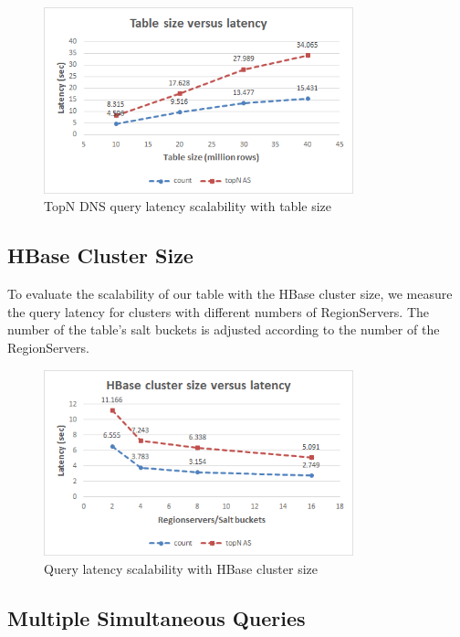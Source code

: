 \begin{figure}[H]
\centering
\includegraphics[width=0.8\textwidth]{figures/benchmarks_hbase_rows_latency_1}
\caption{TopN DNS query latency scalability with table size}
\label{figure:benchmarks_hbase_rows_latency_2}
\end{figure}

\subsection{HBase Cluster Size}

To evaluate the scalability of our table with the HBase cluster size, we measure the query latency for clusters with different numbers of RegionServers. The number of the table's salt buckets is adjusted according to the number of the RegionServers.

\begin{figure}[H]
\centering
\includegraphics[width=0.8\textwidth]{figures/benchmarks_hbase_scalability_latency}
\caption{Query latency scalability with HBase cluster size}
\label{figure:benchmarks_hbase_scalability_latency}
\end{figure}

\subsection{Multiple Simultaneous Queries}


